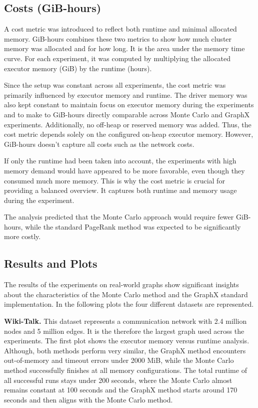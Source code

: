 \subsection{Costs (GiB-hours)}
A cost metric was introduced to reflect both runtime and minimal allocated memory. GiB-hours combines these two metrics to show how much cluster memory was allocated and for how long. It is the area under the memory time curve. For each experiment, it was computed by multiplying the allocated executor memory (GiB) by the runtime (hours). \par
Since the setup was constant across all experiments, the cost metric was primarily influenced by executor memory and runtime. The driver memory was also kept constant to maintain focus on executor memory during the experiments and to make to GiB-hours directly comparable across Monte Carlo and GraphX experiments. Additionally, no off-heap or reserved memory was added. Thus, the cost metric depends solely on the configured on-heap executor memory. However, GiB-hours doesn't capture all costs such as the network costs.\par
If only the runtime had been taken into account, the experiments with high memory demand would have appeared to be more favorable, even though they consumed much more memory. This is why the cost metric is crucial for providing a balanced overview. It captures both runtime and memory usage during the experiment. \par
The analysis predicted that the Monte Carlo approach would require fewer GiB-hours, while the standard PageRank method was expected to be significantly more costly.


\subsection{Results and Plots}

The results of the experiments on real-world graphs show significant insights about the characteristics of the Monte Carlo method and the GraphX standard implementation. In the following plots the four different datasets are represented.\par

\textbf{Wiki-Talk.} This dataset represents a communication network with 2.4 million nodes and 5 million edges. It is the therefore the largest graph used across the experiments. The first plot shows the executor memory versus runtime analysis. Although, both methods perform very similar, the GraphX method encounters out-of-memory and timeout errors under 2000 MiB, while the Monte Carlo method successfully finishes at all memory configurations. The total runtime of all successful runs stays under 200 seconds, where the Monte Carlo almost remains constant at 100 seconds and the GraphX method starts around 170 seconds and then aligns with the Monte Carlo method.\par

